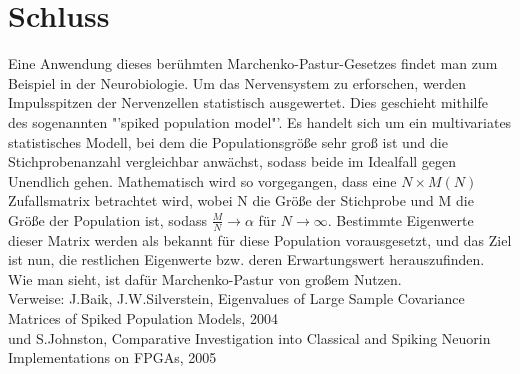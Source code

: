 \documentclass[a4paper, 11pt]{scrreprt}
\begin{document}
\newpage
\section*{Schluss}

Eine Anwendung dieses berühmten Marchenko-Pastur-Gesetzes findet man zum Beispiel in der Neurobiologie. Um das Nervensystem zu erforschen, werden Impulsspitzen der Nervenzellen statistisch ausgewertet. Dies geschieht mithilfe des sogenannten "'spiked population model"'. Es handelt sich um ein multivariates statistisches Modell, bei dem die Populationsgröße sehr groß ist und die Stichprobenanzahl vergleichbar anwächst, sodass beide im Idealfall gegen Unendlich gehen. Mathematisch wird so vorgegangen, dass eine $ N \times M(N) $ Zufallsmatrix betrachtet wird, wobei N die Größe der Stichprobe und M die Größe der Population ist, sodass $ \frac{M}{N} \rightarrow \alpha$ für $N \rightarrow \infty $. Bestimmte Eigenwerte dieser Matrix werden als bekannt für diese Population vorausgesetzt, und das Ziel ist nun, die restlichen Eigenwerte bzw. deren Erwartungswert herauszufinden. Wie man sieht, ist dafür Marchenko-Pastur von großem Nutzen.\\

Verweise: J.Baik, J.W.Silverstein, Eigenvalues of Large Sample Covariance Matrices of Spiked Population Models, 2004\\
und S.Johnston, Comparative Investigation into Classical and Spiking Neuorin Implementations on FPGAs, 2005
\end{document}
